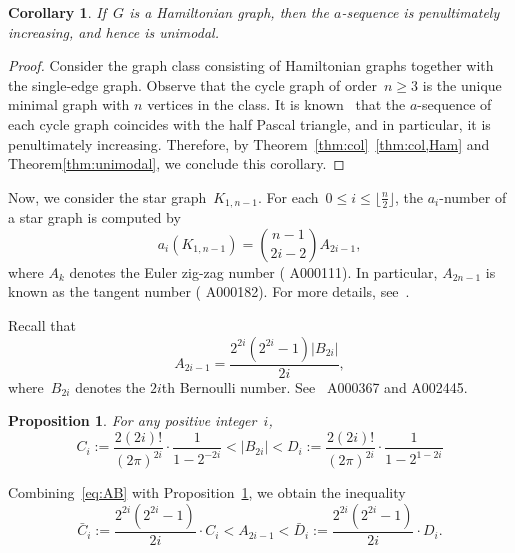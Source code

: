 \documentclass[10pt]{amsart}
\theoremstyle{plain}
\newtheorem{proposition}[theorem]{Proposition}
\newtheorem{corollary}[theorem]{Corollary}
\numberwithin{equation}{section}
\theoremstyle{definition}
\begin{document}
\begin{corollary}\label{cor:Ham}
  If~$G$ is a Hamiltonian graph, then the $a$-sequence is penultimately increasing, and hence is unimodal.
\end{corollary}
\begin{proof}
    Consider the graph class consisting of Hamiltonian graphs together with the single-edge graph.
    Observe that the cycle graph of order~$n \geq 3$ is the unique minimal graph with $n$ vertices in the class.
    It is known~\cite{Choi-Park2015} that the $a$-sequence of each cycle graph coincides with the half Pascal triangle, and in particular, it is penultimately increasing.
    Therefore, by Theorem~\ref{thm:col}~\eqref{thm:col,Ham} and Theorem\ref{thm:unimodal}, we conclude this corollary.
\end{proof}

Now, we consider the star graph~$K_{1,n-1}$.
For each~$0 \leq i \leq \lfloor \frac{n}{2} \rfloor$, the $a_i$-number of a star graph is computed by
\begin{equation}\label{eq:star}
  a_i(K_{1,n-1}) = \binom{n-1}{2i-2}A_{2i-1}, 
\end{equation}
where $A_k$ denotes the Euler zig-zag number (\cite{oeis} A000111).
In particular, $A_{2n-1}$ is known as the tangent number (\cite{oeis} A000182).
For more details, see~\cite{Choi-Park2015}.

Recall that
\begin{equation}\label{eq:AB}
  A_{2i-1} = \frac{2^{2i} (2^{2i} - 1) |B_{2i}|}{2i},
\end{equation}
where~$B_{2i}$ denotes the $2i$th Bernoulli number.
See~\cite{oeis} A000367 and A002445.

\begin{proposition}\cite{Milton_book1974, Alzer2000}\label{prop:Milton}
For any positive integer~$i$,
$$
C_i :=\frac{2 (2i)!}{(2\pi)^{2i}}\cdot \frac{1}{1 - 2^{- 2i}} < |B_{2i}| < D_i := \frac{2 (2i)!}{(2\pi)^{2i}} \cdot \frac{1}{1 - 2^{1 - 2i}}
$$
\end{proposition}
Combining~\eqref{eq:AB} with Proposition~\ref{prop:Milton}, we obtain the inequality
\begin{equation}\label{eq:tan}
   \bar{C}_i := \frac{2^{2i} (2^{2i} - 1)}{2i} \cdot C_i
< A_{2i-1} <
 \bar{D}_i := \frac{2^{2i} (2^{2i} - 1)}{2i} \cdot D_i.
\end{equation}
\end{document}

